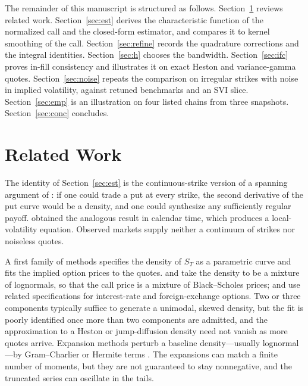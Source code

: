 \documentclass[preprint,12pt,authoryear,times]{elsarticle}
\begin{document}
The remainder of this manuscript is structured as follows. Section~\ref{sec:lit} reviews related work. Section~\ref{sec:est} derives the characteristic function of the normalized call and the closed-form estimator, and compares it to kernel smoothing of the call. Section~\ref{sec:refine} records the quadrature corrections and the integral identities. Section~\ref{sec:h} chooses the bandwidth. Section~\ref{sec:ifc} proves in-fill consistency and illustrates it on exact Heston and variance-gamma quotes. Section~\ref{sec:noise} repeats the comparison on irregular strikes with noise in implied volatility, against retuned benchmarks and an SVI slice. Section~\ref{sec:emp} is an illustration on four listed chains from three snapshots. Section~\ref{sec:conc} concludes.

\section{Related Work}
\label{sec:lit}

The identity of Section~\ref{sec:est} is the continuous-strike version of a spanning argument of \citet{ross1976}: if one could trade a put at every strike, the second derivative of the put curve would be a density, and one could synthesize any sufficiently regular payoff. \citet{dupire1994} obtained the analogous result in calendar time, which produces a local-volatility equation. Observed markets supply neither a continuum of strikes nor noiseless quotes.

A first family of methods specifies the density of \(S_T\) as a parametric curve and fits the implied option prices to the quotes. \citet{ritchey1990} and \citet{melick1997} take the density to be a mixture of lognormals, so that the call price is a mixture of Black--Scholes prices; \citet{bahra1997} and \citet{soderlind1997} use related specifications for interest-rate and foreign-exchange options. Two or three components typically suffice to generate a unimodal, skewed density, but the fit is poorly identified once more than two components are admitted, and the approximation to a Heston or jump-diffusion density need not vanish as more quotes arrive. Expansion methods perturb a baseline density---usually lognormal---by Gram--Charlier or Hermite terms \citep{jarrowrudd1982,corradosu1996,rompolis2007,xiu2014}. The expansions can match a finite number of moments, but they are not guaranteed to stay nonnegative, and the truncated series can oscillate in the tails.
\end{document}
